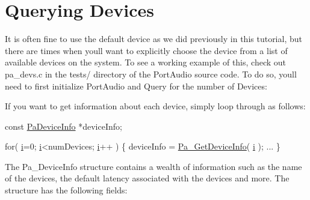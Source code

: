 \hypertarget{querying_devices_tut_query1}{}\section{Querying Devices}\label{querying_devices_tut_query1}
It is often fine to use the default device as we did previously in this tutorial, but there are times when you\textquotesingle{}ll want to explicitly choose the device from a list of available devices on the system. To see a working example of this, check out pa\+\_\+devs.\+c in the tests/ directory of the Port\+Audio source code. To do so, you\textquotesingle{}ll need to first initialize Port\+Audio and Query for the number of Devices\+:




If you want to get information about each device, simply loop through as follows\+:


\begin{DoxyCode}
\textcolor{keyword}{const}   \hyperlink{struct_pa_device_info}{PaDeviceInfo} *deviceInfo;

\textcolor{keywordflow}{for}( \hyperlink{checksum_8c_ab80e330a3bc9e38c1297fe17381e92b4}{i}=0; \hyperlink{checksum_8c_ab80e330a3bc9e38c1297fe17381e92b4}{i}<numDevices; \hyperlink{checksum_8c_ab80e330a3bc9e38c1297fe17381e92b4}{i}++ )
\{
    deviceInfo = \hyperlink{portaudio_8h_ac7d8e091ffc1d1d4a035704660e117eb}{Pa\_GetDeviceInfo}( \hyperlink{checksum_8c_ab80e330a3bc9e38c1297fe17381e92b4}{i} );
    ...
\}
\end{DoxyCode}


The Pa\+\_\+\+Device\+Info structure contains a wealth of information such as the name of the devices, the default latency associated with the devices and more. The structure has the following fields\+:



